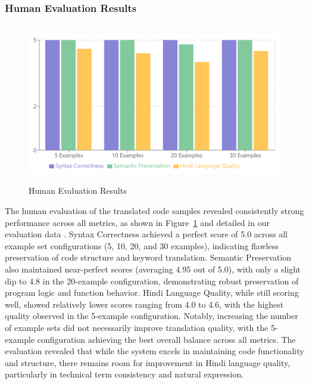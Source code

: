 \documentclass[11pt,a4paper]{article}
\begin{document}
\subsubsection{Human Evaluation Results}
\begin{figure}
    \centering
    \includegraphics[width=0.9\linewidth,height=7cm,keepaspectratio]{Graphs/human_eval_graph.png}
    \caption{Human Evaluation Results}
    \label{fig:human-evaluation-results}
\end{figure}
The human evaluation of the translated code samples revealed consistently strong performance across all metrics, as shown in Figure~\ref{fig:human-evaluation-results} and detailed in our evaluation data \cite{pylinguisthumanfeedback}. Syntax Correctness achieved a perfect score of 5.0 across all example set configurations (5, 10, 20, and 30 examples), indicating flawless preservation of code structure and keyword translation. Semantic Preservation also maintained near-perfect scores (averaging 4.95 out of 5.0), with only a slight dip to 4.8 in the 20-example configuration, demonstrating robust preservation of program logic and function behavior. Hindi Language Quality, while still scoring well, showed relatively lower scores ranging from 4.0 to 4.6, with the highest quality observed in the 5-example configuration. Notably, increasing the number of example sets did not necessarily improve translation quality, with the 5-example configuration achieving the best overall balance across all metrics. The evaluation revealed that while the system excels in maintaining code functionality and structure, there remains room for improvement in Hindi language quality, particularly in technical term consistency and natural expression.
\end{document}
